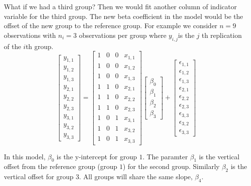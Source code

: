 \documentclass[]{book}
\theoremstyle{definition}
\theoremstyle{definition}
\theoremstyle{remark}
\begin{document}
What if we had a third group? Then we would fit another column of
indicator variable for the third group. The new beta coefficient in the
model would be the offset of the new group to the reference group. For
example we consider \(n=9\) observations with \(n_i=3\) observations per
group where \(y_{i,j}\)is the \(j\) th replication of the \(i\)th group.
\[\left[\begin{array}{c}
y_{1,1}\\
y_{1,2}\\
y_{1,3}\\
y_{2,1}\\
y_{2,2}\\
y_{2,3}\\
y_{3,1}\\
y_{3,2}\\
y_{3,3}
\end{array}\right]=\left[\begin{array}{cccc}
1 & 0 & 0 & x_{1,1}\\
1 & 0 & 0 & x_{1,2}\\
1 & 0 & 0 & x_{1,3}\\
1 & 1 & 0 & x_{2,1}\\
1 & 1 & 0 & x_{2,2}\\
1 & 1 & 0 & x_{2,3}\\
1 & 0 & 1 & x_{3,1}\\
1 & 0 & 1 & x_{3,2}\\
1 & 0 & 1 & x_{3,3}
\end{array}\right]\left[\begin{array}{c}
\beta_{0}\\
\beta_{1}\\
\beta_{2}\\
\beta_{3}
\end{array}\right]+\left[\begin{array}{c}
\epsilon_{1,1}\\
\epsilon_{1,2}\\
\epsilon_{1,3}\\
\epsilon_{2,1}\\
\epsilon_{2,2}\\
\epsilon_{2,3}\\
\epsilon_{3,3}\\
\epsilon_{3,2}\\
\epsilon_{3,3}
\end{array}\right]
\]

In this model, \(\beta_0\) is the y-intercept for group \(1\). The
paramter \(\beta_1\) is the vertical offset from the reference group
(group \(1\)) for the second group. Similarly \(\beta_2\) is the
vertical offset for group \(3\). All groups will share the same slope,
\(\beta_4\).
\end{document}
